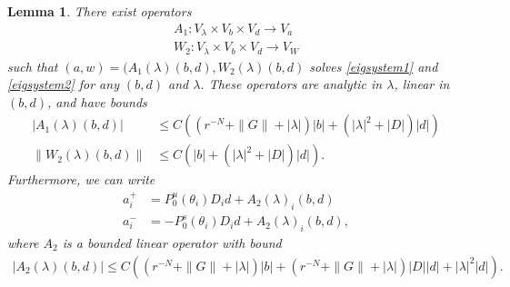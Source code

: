\documentclass[12pt]{elsarticle}
\newtheorem{lemma}{Lemma}
\begin{document}
\begin{lemma}\label{eiginv2}
There exist operators 
\begin{align*}
A_1 : V_\lambda \times V_b \times V_d \rightarrow V_a \\
W_2 : V_\lambda \times V_b \times V_d \rightarrow V_W
\end{align*}
such that $(a, w) = (A_1(\lambda)(b,d), W_2(\lambda)(b,d)$ solves \cref{eigsystem1} and \cref{eigsystem2} for any $(b, d)$ and $\lambda$. These operators are analytic in $\lambda$, linear in $(b,d)$, and have bounds 
\begin{align}
|A_1(\lambda)(b, d)| &\leq C \left( (r^{-N} + \|G\| + |\lambda| ) |b| + (|\lambda|^2 + |D| ) |d| \right) \label{A1bound} \\
\|W_2(\lambda)(b,d)\| &\leq C \left( |b| + (|\lambda|^2 + |D|) |d| \right). \label{W2bound}
\end{align}
Furthermore, we can write
\begin{align*}
a_i^+ &= P_0^u(\theta_i) D_i d + A_2(\lambda)_i(b,d) \\
a_i^- &= -P_0^s(\theta_i) D_i d + A_2(\lambda)_i(b,d),
\end{align*}
where $A_2$ is a bounded linear operator with bound
\begin{align}\label{A2bound}
|A_2(\lambda)(b,d)| \leq 
C\left( (r^{-N} + \|G\| + |\lambda| )|b| + (r^{-N} + \|G\| + |\lambda|)|D||d| + |\lambda|^2 |d|  \right).
\end{align}


\end{lemma}
\end{document}
